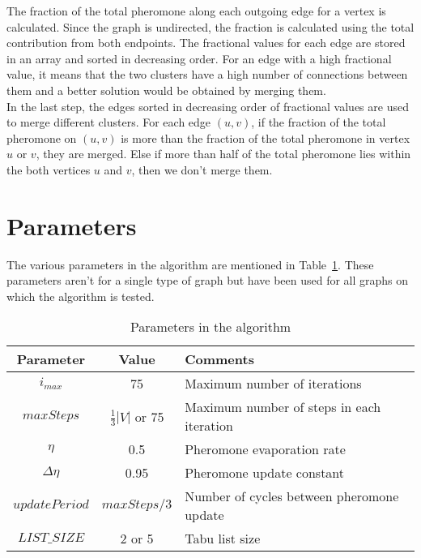 \begin{spacing}{1.5}
\indent The fraction of the total pheromone along each outgoing edge for a vertex is calculated. Since the graph is undirected, the fraction is calculated using the total contribution from both endpoints. The fractional values for each edge are stored in an array and sorted in decreasing order. For an edge with a high fractional value, it means that the two clusters have a high number of connections between them and a better solution would be obtained by merging them.\\
\indent In the last step, the edges sorted in decreasing order of fractional values are used to merge different clusters. For each edge $(u, v)$, if the fraction of the total pheromone on $(u,v)$ is more than the fraction of the total pheromone in vertex $u$ or $v$, they are merged. Else if more than half of the total pheromone lies within the both vertices $u$ and $v$, then we don't merge them.\\

\section{Parameters}

The various parameters in the algorithm are mentioned in Table~\ref{tab1}. These parameters aren't for a single type of graph but have been used for all graphs on which the algorithm is tested.

\begin{table}
\caption{Parameters in the algorithm}
\label{tab1}
\BlankLine
\begin{tabular}{ | c | c | l | }
	\hline
	\textbf{Parameter} & \textbf{Value} & \textbf{Comments} \\
	\hline
	$i_{max}$ & 75 & Maximum number of iterations \\
	\hline
	$maxSteps$ & $\frac{1}{3} |V|$ or 75 & Maximum number of steps in each iteration \\
	\hline
	$\eta$ & 0.5 & Pheromone evaporation rate \\
	\hline
	$\Delta \eta$ & 0.95 & Pheromone update constant \\
	\hline
	$updatePeriod$ & $maxSteps / 3$ & Number of cycles between pheromone update \\
	\hline
	$LIST\_SIZE$ & 2 or 5 & Tabu list size\\
	\hline
\end{tabular}
\end{table}
\end{spacing}